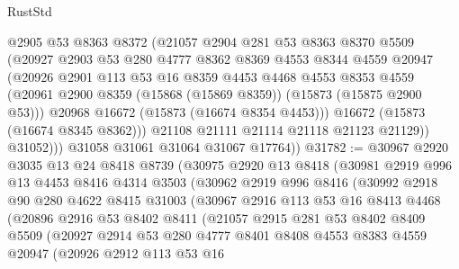 \begin{lexlean}{RustStd}
\begin{coremodule}
                @2905
                @53
                @8363
                @8372
                (@21057
                  @2904
                  @281
                  @53
                  @8363
                  @8370
                  @5509
                  (@20927
                    @2903
                    @53
                    @280
                    @4777
                    @8362
                    @8369
                    @4553
                    @8344
                    @4559
                    @20947
                    (@20926
                      @2901
                      @113
                      @53
                      @16
                      @8359
                      @4453
                      @4468
                      @4553
                      @8353
                      @4559
                      (@20961 @2900 @8359 (@15868 (@15869 @8359)) (@15873 (@15875 @2900 @53)))
                      @20968
                      @16672
                      (@15873 (@16674 @8354 @4453)))
                    @16672
                    (@15873 (@16674 @8345 @8362)))
                  @21108
                  @21111
                  @21114
                  @21118
                  @21123
                  @21129))
              @31052)))
        @31058
        @31061
        @31064
        @31067
        @17764))
@31782 := @30967
    @2920
    @3035
    @13
    @24
    @8418
    @8739
    (@30975
      @2920
      @13
      @8418
      (@30981
        @2919
        @996
        @13
        @4453
        @8416
        @4314
        @3503
        (@30962
          @2919
          @996
          @8416
          (@30992
            @2918
            @90
            @280
            @4622
            @8415
            @31003
            (@30967
              @2916
              @113
              @53
              @16
              @8413
              @4468
              (@20896
                @2916
                @53
                @8402
                @8411
                (@21057
                  @2915
                  @281
                  @53
                  @8402
                  @8409
                  @5509
                  (@20927
                    @2914
                    @53
                    @280
                    @4777
                    @8401
                    @8408
                    @4553
                    @8383
                    @4559
                    @20947
                    (@20926
                      @2912
                      @113
                      @53
                      @16

\end{coremodule}
\end{lexlean}

